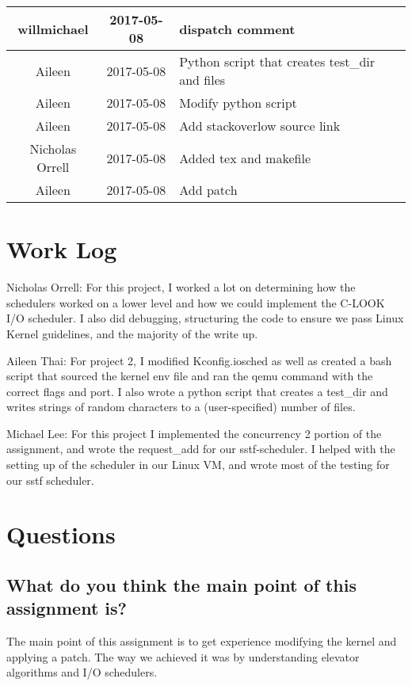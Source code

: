 \documentclass[draftclsnofoot, onecolumn]{IEEEtran}
\begin{document}
\begin{center}
\begin{tabular} { |c|c|l|c|}
willmichael & 2017-05-08 & dispatch comment \\ \hline
Aileen & 2017-05-08 & Python script that creates test\_dir and files \\ \hline
Aileen & 2017-05-08 & 	Modify python script \\ \hline
Aileen & 2017-05-08 & 	Add stackoverlow source link \\ \hline
Nicholas Orrell & 2017-05-08 & 	Added tex and makefile \\ \hline
Aileen & 2017-05-08 & 	Add patch
\\\hline
\end{tabular}
\end{center}

\section{Work Log}
Nicholas Orrell: For this project, I worked a lot on determining how the schedulers worked on a lower level and how we could implement the C-LOOK I/O scheduler. I also did debugging, structuring the code to ensure we pass Linux Kernel guidelines, and the majority of the write up.

Aileen Thai: For project 2, I modified Kconfig.iosched as well as created a bash script that sourced the kernel env file and ran the qemu command with the correct flags and port. I also wrote a python script that creates a test\_dir and writes strings of random characters to a (user-specified) number of files.  

Michael Lee: For this project I implemented the concurrency 2 portion of the assignment, and wrote the request\_add for our sstf-scheduler. I helped with the setting up of the scheduler in our Linux VM, and wrote most of the testing for our sstf scheduler.

\section{Questions}

\subsection{What do you think the main point of this assignment is?}
The main point of this assignment is to get experience modifying the kernel and applying a patch. The way we achieved it was by understanding elevator algorithms and I/O schedulers.
\end{document}
